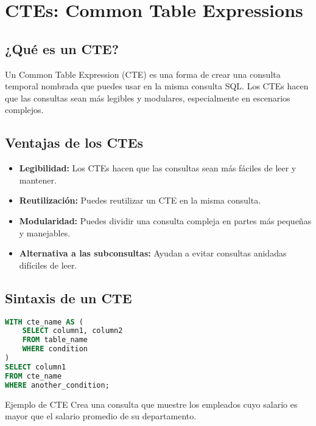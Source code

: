 \chapter{CTEs: Common Table Expressions}

\section{¿Qué es un CTE?}

Un Common Table Expression (CTE) es una forma de crear una consulta
temporal nombrada que puedes usar en la misma consulta SQL.
Los CTEs hacen que las consultas sean más legibles y modulares,
especialmente en escenarios complejos.

\section{Ventajas de los CTEs}

\begin{itemize}
    \item \textbf{Legibilidad:} Los CTEs hacen que las consultas sean más fáciles de leer y mantener.
    \item \textbf{Reutilización:} Puedes reutilizar un CTE en la misma consulta.
    \item \textbf{Modularidad:} Puedes dividir una consulta compleja en partes más pequeñas y manejables.
    \item \textbf{Alternativa a las subconsultas:} Ayudan a evitar consultas anidadas difíciles de leer.
\end{itemize}

\section{Sintaxis de un CTE}

\begin{lstlisting}[language=SQL]
WITH cte_name AS (
    SELECT column1, column2
    FROM table_name
    WHERE condition
)
SELECT column1
FROM cte_name
WHERE another_condition;
\end{lstlisting}

\begin{examplebox}{Ejemplo de CTE}
    Crea una consulta que muestre los empleados cuyo salario es mayor que el salario promedio de su departamento.
\end{examplebox}

\vspace{10pt}


